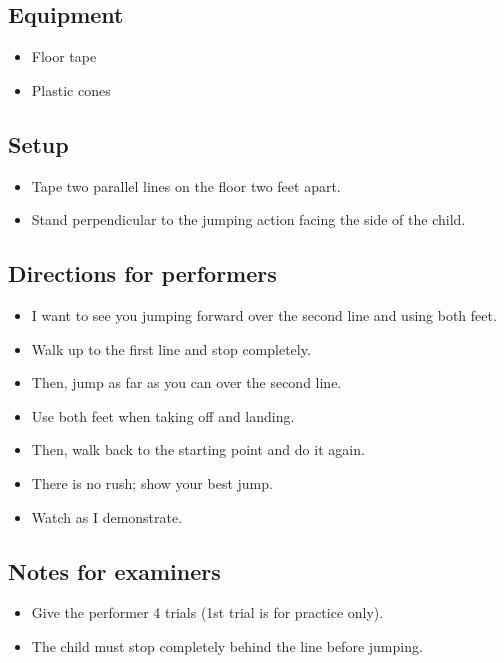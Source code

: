 \documentclass[
  letterpaper,
  DIV=11,
  numbers=noendperiod]{scrreprt}
\providecommand{\tightlist}{%
  \setlength{\itemsep}{0pt}\setlength{\parskip}{0pt}}
\begin{document}
\subsection{Equipment}\label{equipment-7}

\begin{itemize}
\tightlist
\item
  Floor tape
\item
  Plastic cones
\end{itemize}

\subsection{Setup}\label{setup-6}

\begin{itemize}
\tightlist
\item
  Tape two parallel lines on the floor two feet apart.
\item
  Stand perpendicular to the jumping action facing the side of the
  child.
\end{itemize}

\subsection{Directions for
performers}\label{directions-for-performers-6}

\begin{itemize}
\tightlist
\item
  I want to see you jumping forward over the second line and using both
  feet.
\item
  Walk up to the first line and stop completely.
\item
  Then, jump as far as you can over the second line.
\item
  Use both feet when taking off and landing.
\item
  Then, walk back to the starting point and do it again.
\item
  There is no rush; show your best jump.
\item
  Watch as I demonstrate.
\end{itemize}

\subsection{Notes for examiners}\label{notes-for-examiners-6}

\begin{itemize}
\tightlist
\item
  Give the performer 4 trials (1st trial is for practice only).
\item
  The child must stop completely behind the line before jumping.
\end{itemize}
\end{document}
